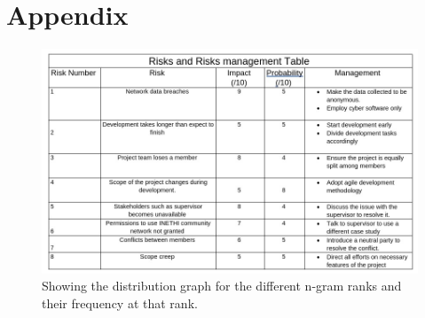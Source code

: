 \pagebreak
\newpage
\section{Appendix}
\begin{figure}
	\begin{center}
		\includegraphics[width=1\linewidth]{res/risks.jpeg}
	\end{center}
	\caption{Showing the distribution graph for the different n-gram ranks and their frequency at that rank.}
	\label{fig-ffsm}
\end{figure}
